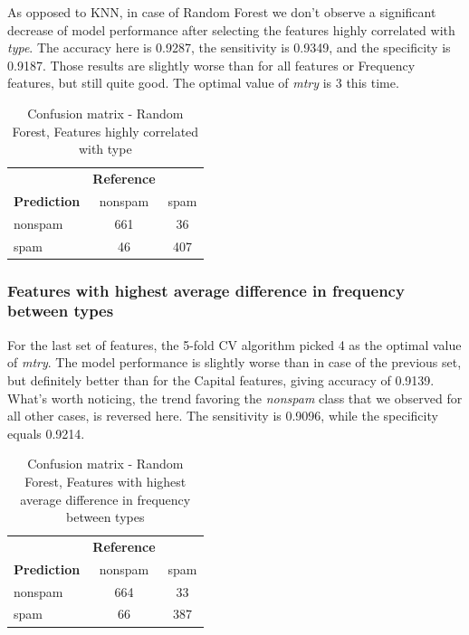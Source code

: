 \documentclass{article}\usepackage[]{graphicx}\usepackage[]{xcolor}
\begin{document}
As opposed to KNN, in case of Random Forest we don't observe a significant decrease
of model performance after selecting the features highly correlated with \textit{type}.
The accuracy here is 0.9287, the sensitivity is 0.9349, and the specificity is 0.9187.
Those results are slightly worse than for all features or Frequency features, but
still quite good. The optimal value of \textit{mtry} is 3 this time.

\begin{table}[h]
    \centering
    \begin{tabular}{lcc}
        & \textbf{Reference} & \\
        \textbf{Prediction} & nonspam & spam \\
        nonspam & 661 & 36 \\
        spam & 46 & 407 \\
    \end{tabular}
    \caption{Confusion matrix - Random Forest, Features highly correlated with type}
    \label{RFcm4}
\end{table}

\subsubsection*{Features with highest average difference in frequency between types}

For the last set of features, the 5-fold CV algorithm picked 4 as the optimal
value of \textit{mtry}. The model performance is slightly worse than in case of
the previous set, but definitely better than for the Capital features,
giving accuracy of 0.9139. What's worth noticing, the trend favoring the \textit{nonspam}
class that we observed for all other cases, is reversed here. The sensitivity 
is 0.9096, while the specificity equals 0.9214.

\begin{table}[h]
    \centering
    \begin{tabular}{lcc}
        & \textbf{Reference} & \\
        \textbf{Prediction} & nonspam & spam \\
        nonspam & 664 & 33 \\
        spam & 66 & 387 \\
    \end{tabular}
    \caption{Confusion matrix - Random Forest, Features with highest average difference in frequency between types}
    \label{RFcm5}
\end{table}
\end{document}
